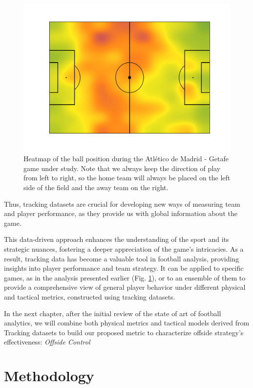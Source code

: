 \documentclass[
  10pt,
  twoside,nohyper]{book}
\begin{document}
\begin{figure}[H]

{\centering \includegraphics[width=0.8\linewidth,]{imagenes/Heatmap} 

}

\caption{Heatmap of the ball position during the Atlético de Madrid - Getafe game under study. Note that we always keep the direction of play from left to right, so the home team will always be placed on the left side of the field and the away team on the right.}\label{fig:heatmap}
\end{figure}

Thus, tracking datasets are crucial for developing new ways of measuring team and player performance, as they provide us with global information about the game.

This data-driven approach enhances the understanding of the sport and its strategic nuances, fostering a deeper appreciation of the game's intricacies. As a result, tracking data has become a valuable tool in football analysis, providing insights into player performance and team strategy. It can be applied to specific games, as in the analysis presented earlier (Fig. \ref{fig:heatmap}), or to an ensemble of them to provide a comprehensive view of general player behavior under different physical and tactical metrics, constructed using tracking datasets.

In the next chapter, after the initial review of the state of art of football analytics, we will combine both physical metrics and tactical models derived from Tracking datasets to build our proposed metric to characterize offside strategy's effectiveness: \emph{Offside Control}

\chapter{Methodology}\label{methodology}
\end{document}
